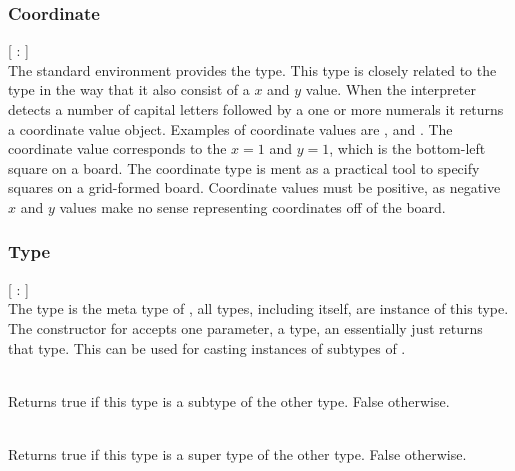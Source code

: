 \subsubsection{Coordinate}
\begin{dlist}
  \item {}[ : ]\\
    The standard environment provides the  type. This type
    is closely related to the  type in the way that it also consist of
    a $x$ and $y$ value. When the interpreter detects a number of
    capital letters followed by a one or more numerals it returns a coordinate
    value object. Examples of coordinate values are , 
    and . The coordinate value  corresponds to the
    $x = 1$ and $y = 1$, which is the bottom-left square on a board.
    The coordinate type is ment as a practical tool to specify squares on a
    grid-formed board. Coordinate values must be positive, as negative $x$ and
    $y$ values make no sense representing coordinates off of the board.
\end{dlist}

\subsubsection{Type}
\begin{dlist}
  \item {}[ : ]\\
    The  type is the meta type of \productname{}, all types,
    including  itself, are instance of this type. The constructor for
     accepts one parameter, a type, an essentially just returns that
    type. This can be used for casting instances of subtypes of .
  \item {}\\
    Returns true if this type is a subtype of the other type. False otherwise.
  \item {}\\
    Returns true if this type is a super type of the other type. False
    otherwise.
\end{dlist}

